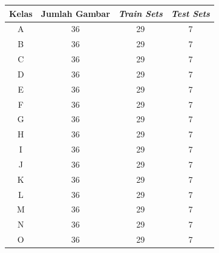 \begin{table}[H]
  \begin{center}
    \begin{tabular}{|c|c|c|c|}
    \hline
    \textbf{Kelas} & \textbf{Jumlah Gambar} & \textbf{\textit{Train Sets}} & \textbf{\textit{Test Sets}} \\ \hline
    A                                    & 36                     & 29                  & 7                  \\ \hline
    B                                    & 36                     & 29                  & 7                  \\ \hline
    C                                    & 36                     & 29                  & 7                  \\ \hline
    D                                    & 36                     & 29                  & 7                  \\ \hline
    E                                    & 36                     & 29                  & 7                  \\ \hline
    F                                    & 36                     & 29                  & 7                  \\ \hline
    G                                    & 36                     & 29                  & 7                  \\ \hline
    H                                    & 36                     & 29                  & 7                  \\ \hline
    I                                    & 36                     & 29                  & 7                  \\ \hline
    J                                    & 36                     & 29                  & 7                  \\ \hline
    K                                    & 36                     & 29                  & 7                  \\ \hline
    L                                    & 36                     & 29                  & 7                  \\ \hline
    M                                    & 36                     & 29                  & 7                  \\ \hline
    N                                    & 36                     & 29                  & 7                  \\ \hline
    O                                    & 36                     & 29                  & 7                  \\ \hline

\end{tabular}
\end{center}
\end{table}
